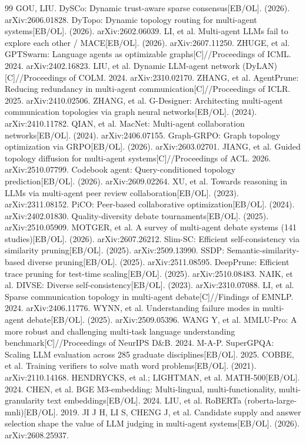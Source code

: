 \documentclass[UTF8,11pt]{ctexart}
\begin{document}
\begin{thebibliography}{99}
 GOU, LIU. DySCo: Dynamic trust-aware sparse consensus[EB/OL]. (2026). arXiv:2606.01828.
 DyTopo: Dynamic topology routing for multi-agent systems[EB/OL]. (2026). arXiv:2602.06039.
 LI, et al. Multi-agent LLMs fail to explore each other / MACE[EB/OL]. (2026). arXiv:2607.11250.
 ZHUGE, et al. GPTSwarm: Language agents as optimizable graphs[C]//Proceedings of ICML. 2024. arXiv:2402.16823.
 LIU, et al. Dynamic LLM-agent network (DyLAN)[C]//Proceedings of COLM. 2024. arXiv:2310.02170.
 ZHANG, et al. AgentPrune: Reducing redundancy in multi-agent communication[C]//Proceedings of ICLR. 2025. arXiv:2410.02506.
 ZHANG, et al. G-Designer: Architecting multi-agent communication topologies via graph neural networks[EB/OL]. (2024). arXiv:2410.11782.
 QIAN, et al. MacNet: Multi-agent collaboration networks[EB/OL]. (2024). arXiv:2406.07155.
 Graph-GRPO: Graph topology optimization via GRPO[EB/OL]. (2026). arXiv:2603.02701.
 JIANG, et al. Guided topology diffusion for multi-agent systems[C]//Proceedings of ACL. 2026. arXiv:2510.07799.
 Codebook agent: Query-conditioned topology prediction[EB/OL]. (2026). arXiv:2609.02264.
 XU, et al. Towards reasoning in LLMs via multi-agent peer review collaboration[EB/OL]. (2023). arXiv:2311.08152.
 PiCO: Peer-based collaborative optimization[EB/OL]. (2024). arXiv:2402.01830.
 Quality-diversity debate tournaments[EB/OL]. (2025). arXiv:2510.05909.
 MOTGER, et al. A survey of multi-agent debate systems (141 studies)[EB/OL]. (2026). arXiv:2607.26212.
 Slim-SC: Efficient self-consistency via similarity pruning[EB/OL]. (2025). arXiv:2509.13990.
 SSDP: Semantic-similarity-based diverse pruning[EB/OL]. (2025). arXiv:2511.08595.
 DeepPrune: Efficient trace pruning for test-time scaling[EB/OL]. (2025). arXiv:2510.08483.
 NAIK, et al. DIVSE: Diverse self-consistency[EB/OL]. (2023). arXiv:2310.07088.
 LI, et al. Sparse communication topology in multi-agent debate[C]//Findings of EMNLP. 2024. arXiv:2406.11776.
 WYNN, et al. Understanding failure modes in multi-agent debate[EB/OL]. (2025). arXiv:2509.05396.
 WANG Y, et al. MMLU-Pro: A more robust and challenging multi-task language understanding benchmark[C]//Proceedings of NeurIPS D\&B. 2024.
 M-A-P. SuperGPQA: Scaling LLM evaluation across 285 graduate disciplines[EB/OL]. 2025.
 COBBE, et al. Training verifiers to solve math word problems[EB/OL]. (2021). arXiv:2110.14168.
 HENDRYCKS, et al.; LIGHTMAN, et al. MATH-500[EB/OL]. 2024.
 CHEN, et al. BGE M3-embedding: Multi-lingual, multi-functionality, multi-granularity text embeddings[EB/OL]. 2024.
 LIU, et al. RoBERTa (roberta-large-mnli)[EB/OL]. 2019.
 JI J H, LI S, CHENG J, et al. Candidate supply and answer selection shape the value of LLM judging in multi-agent systems[EB/OL]. (2026). arXiv:2608.25937.

\end{thebibliography}
\end{document}
